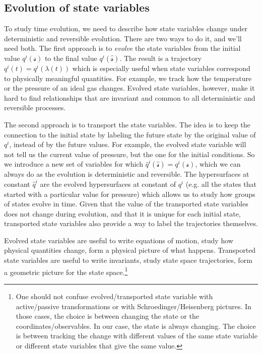 \documentclass[smallextended]{svjour3}
\numberwithin{equation}{section}
\theoremstyle{definition}
\begin{document}
\subsection{Evolution of state variables}

To study time evolution, we need to describe how state variables change under deterministic and reversible evolution. There are two ways to do it, and we'll need both. The first approach is to \emph{evolve} the state variables from the initial value $q^i(\mathcal{s})$ to the final value $q^i(\hat{\mathcal{s}})$. The result is a trajectory $q^i(t)=q^i(\lambda(t))$ which is especially useful when state variables correspond to physically meaningful quantities. For example, we track how the temperature or the pressure of an ideal gas changes. Evolved state variables, however, make it hard to find relationships that are invariant and common to all deterministic and reversible processes.

The second approach is to transport the state variables. The idea is to keep the connection to the initial state by labeling the future state by the original value of $q^i$, instead of by the future values. For example, the evolved state variable will not tell us the current value of pressure, but the one for the initial conditions. So we introduce a new set of variables for which $\hat{q}^i(\hat{\mathcal{s}})=q^i(\mathcal{s})$, which we can always do as the evolution is deterministic and reversible. The hypersurfaces at constant $\hat{q}^i$ are the evolved hypersurfaces at constant of $q^i$ (e.g. all the states that started with a particular value for pressure) which allows us to study how groups of states evolve in time. Given that the value of the transported state variables does not change during evolution, and that it is unique for each initial state, transported state variables also provide a way to label the trajectories themselves.

Evolved state variables are useful to write equations of motion, study how physical quantities change, form a physical picture of what happens. Transported state variables are useful to write invariants, study state space trajectories, form a geometric picture for the state space.\footnote{One should not confuse evolved/transported state variable with active/passive transformations or with Schroedinger/Heisenberg pictures. In those cases, the choice is between changing the state or the coordinates/observables. In our case, the state is always changing. The choice is between tracking the change with different values of the same state variable or different state variables that give the same value.}
\end{document}
